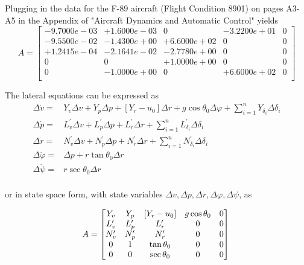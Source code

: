 \documentclass[12pt]{article}
\begin{document}
\noindent Plugging in the data for the F-89 aircraft (Flight Condition 8901) on pages A3-A5 in the Appendix of "Aircraft Dynamics and Automatic Control" yields
\begin{equation*}
A =
\begin{bmatrix}
  -9.7000e-03  & +1.6000e-03  &           0  & -3.2200e+01 &           0 \\
  -9.5500e-02  & -1.4300e+00  & +6.6000e+02  &           0 &           0 \\
  +1.2415e-04  & -2.1641e-02  & -2.7780e+00  &           0 &           0 \\
            0  &           0  & +1.0000e+00  &           0 &           0 \\
            0  & -1.0000e+00  &           0  & +6.6000e+02 &           0 \\
\end{bmatrix}
\end{equation*}

\noindent The lateral equations can be expressed as
\begin{equation}
\begin{split}
\Delta \dot{v} = & Y_v\Delta v + Y_p\Delta p + \left[ Y_r - u_0 \right]\Delta r + g\cos\theta_0\Delta \varphi + \sum\limits_{i=1}^n Y_{\delta_i} \Delta \delta_i \\
\Delta \dot{p} = & L_v^\prime \Delta v + L_p^\prime \Delta p + L_r^\prime \Delta r + \sum\limits_{i=1}^n L_{\delta_i}^\prime \Delta \delta_i \\
\Delta \dot{r} = & N_v^\prime \Delta v + N_p^\prime \Delta p + N_r^\prime \Delta r + \sum\limits_{i=1}^n N_{\delta_i}^\prime \Delta \delta_i \\
\Delta \dot{\varphi} = &\Delta p + r\tan\theta_0\Delta r\\
\Delta \dot{\psi} = &r\sec\theta_0\Delta r\\
\end{split}
\label{lat}
\end{equation}

\noindent or in state space form, with state variables $\Delta v, \Delta p, \Delta r, \Delta \varphi, \Delta \psi $, as

\begin{equation*}
A =
\begin{bmatrix}
    Y_v & Y_p & \left[ Y_r-u_0 \right] & g\cos \theta_0 & 0 \\
    L_v^\prime & L_p^\prime & L_r^\prime & 0 & 0 \\
    N_v^\prime & N_p^\prime & N_r^\prime & 0 & 0 \\
    0 & 1 & \tan \theta_0 & 0 & 0 \\
    0 & 0 & \sec \theta_0 & 0 & 0
\end{bmatrix}\\
\end{equation*}
\end{document}
